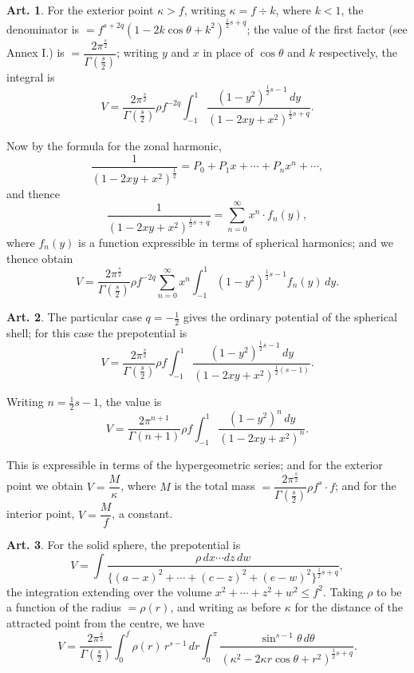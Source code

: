 \documentclass[12pt,a4paper]{article}
\theoremstyle{definition}
\newtheorem{art}{Art.}[section]
\begin{document}
\begin{art}\label{art:62}
For the exterior point $\kappa > f$, writing $\kappa = f \div k$, where $k < 1$, the denominator is $= f^{s+2q}(1 - 2k\cos\theta + k^2)^{\frac{1}{2}s+q}$; the value of the first factor (see Annex I.) is $= \dfrac{2\pi^{\frac{s}{2}}}{\Gamma(\frac{s}{2})}$; writing $y$ and $x$ in place of $\cos\theta$ and $k$ respectively, the integral is
\[
V = \frac{2\pi^{\frac{s}{2}}}{\Gamma(\frac{s}{2})} \rho f^{-2q} \int_{-1}^1 \frac{(1-y^2)^{\frac{1}{2}s-1} \, dy}{(1-2xy+x^2)^{\frac{1}{2}s+q}}.
\]

Now by the formula for the zonal harmonic,
\[
\frac{1}{(1-2xy+x^2)^{\frac{1}{2}}} = P_0 + P_1 x + \cdots + P_n x^n + \cdots,
\]
and thence
\[
\frac{1}{(1-2xy+x^2)^{\frac{1}{2}s+q}} = \sum_{n=0}^\infty x^n \cdot f_n(y),
\]
where $f_n(y)$ is a function expressible in terms of spherical harmonics; and we thence obtain
\[
V = \frac{2\pi^{\frac{s}{2}}}{\Gamma(\frac{s}{2})} \rho f^{-2q} \sum_{n=0}^\infty x^n \int_{-1}^1 (1-y^2)^{\frac{1}{2}s-1} f_n(y) \, dy.
\]
\end{art}

\begin{art}\label{art:63}
The particular case $q = -\tfrac{1}{2}$ gives the ordinary potential of the spherical shell; for this case the prepotential is
\[
V = \frac{2\pi^{\frac{s}{2}}}{\Gamma(\frac{s}{2})} \rho f \int_{-1}^1 \frac{(1-y^2)^{\frac{1}{2}s-1} \, dy}{(1-2xy+x^2)^{\frac{1}{2}(s-1)}}.
\]

Writing $n = \frac{1}{2}s-1$, the value is
\[
V = \frac{2\pi^{n+1}}{\Gamma(n+1)} \rho f \int_{-1}^1 \frac{(1-y^2)^n \, dy}{(1-2xy+x^2)^n}.
\]

This is expressible in terms of the hypergeometric series; and for the exterior point we obtain $V = \dfrac{M}{\kappa}$, where $M$ is the total mass $= \dfrac{2\pi^{\frac{s}{2}}}{\Gamma(\frac{s}{2})} \rho f^s \cdot f$; and for the interior point, $V = \dfrac{M}{f}$, a constant.
\end{art}

\begin{art}\label{art:64}
For the solid sphere, the prepotential is
\[
V = \int \frac{\rho \, dx \cdots dz \, dw}{\{(a-x)^2 + \cdots + (c-z)^2 + (e-w)^2\}^{\frac{1}{2}s+q}},
\]
the integration extending over the volume $x^2 + \cdots + z^2 + w^2 \leq f^2$. Taking $\rho$ to be a function of the radius $= \rho(r)$, and writing as before $\kappa$ for the distance of the attracted point from the centre, we have
\[
V = \frac{2\pi^{\frac{s}{2}}}{\Gamma(\frac{s}{2})} \int_0^f \rho(r) \, r^{s-1} \, dr \int_0^\pi \frac{\sin^{s-1}\theta \, d\theta}{(\kappa^2 - 2\kappa r\cos\theta + r^2)^{\frac{1}{2}s+q}}.
\]
\end{art}
\end{document}
